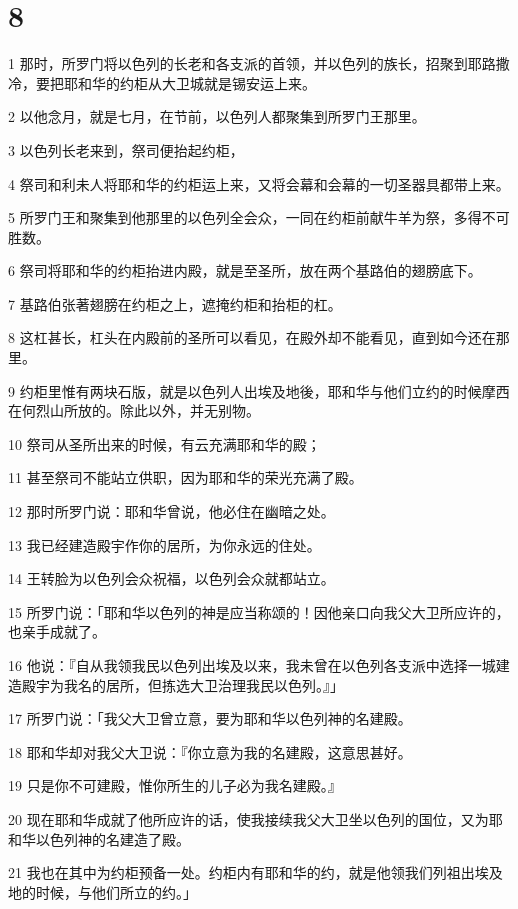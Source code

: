 \chapter{8}

\par 1 那时，所罗门将以色列的长老和各支派的首领，并以色列的族长，招聚到耶路撒冷，要把耶和华的约柜从大卫城就是锡安运上来。
\par 2 以他念月，就是七月，在节前，以色列人都聚集到所罗门王那里。
\par 3 以色列长老来到，祭司便抬起约柜，
\par 4 祭司和利未人将耶和华的约柜运上来，又将会幕和会幕的一切圣器具都带上来。
\par 5 所罗门王和聚集到他那里的以色列全会众，一同在约柜前献牛羊为祭，多得不可胜数。
\par 6 祭司将耶和华的约柜抬进内殿，就是至圣所，放在两个基路伯的翅膀底下。
\par 7 基路伯张著翅膀在约柜之上，遮掩约柜和抬柜的杠。
\par 8 这杠甚长，杠头在内殿前的圣所可以看见，在殿外却不能看见，直到如今还在那里。
\par 9 约柜里惟有两块石版，就是以色列人出埃及地後，耶和华与他们立约的时候摩西在何烈山所放的。除此以外，并无别物。
\par 10 祭司从圣所出来的时候，有云充满耶和华的殿；
\par 11 甚至祭司不能站立供职，因为耶和华的荣光充满了殿。
\par 12 那时所罗门说：耶和华曾说，他必住在幽暗之处。
\par 13 我已经建造殿宇作你的居所，为你永远的住处。
\par 14 王转脸为以色列会众祝福，以色列会众就都站立。
\par 15 所罗门说：「耶和华以色列的神是应当称颂的！因他亲口向我父大卫所应许的，也亲手成就了。
\par 16 他说：『自从我领我民以色列出埃及以来，我未曾在以色列各支派中选择一城建造殿宇为我名的居所，但拣选大卫治理我民以色列。』」
\par 17 所罗门说：「我父大卫曾立意，要为耶和华以色列神的名建殿。
\par 18 耶和华却对我父大卫说：『你立意为我的名建殿，这意思甚好。
\par 19 只是你不可建殿，惟你所生的儿子必为我名建殿。』
\par 20 现在耶和华成就了他所应许的话，使我接续我父大卫坐以色列的国位，又为耶和华以色列神的名建造了殿。
\par 21 我也在其中为约柜预备一处。约柜内有耶和华的约，就是他领我们列祖出埃及地的时候，与他们所立的约。」
